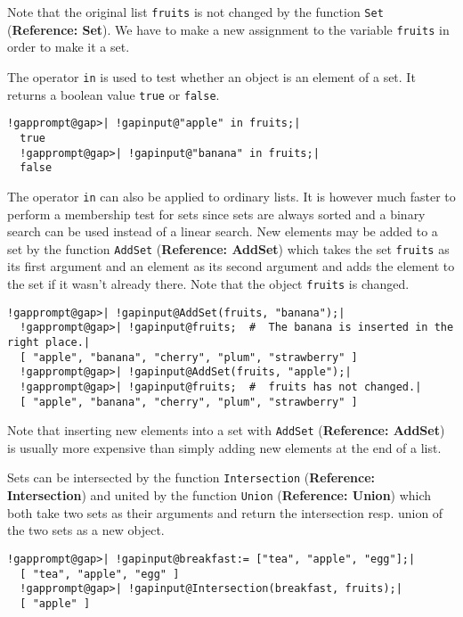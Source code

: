 \documentclass[a4paper,11pt]{report}
\begin{document}
{{ Note that the original list \texttt{fruits} is not changed by the function \texttt{Set} (\textbf{Reference: Set}). We have to make a new assignment to the variable \texttt{fruits} in order to make it a set. 

 The operator \texttt{in} is used to test whether an object is an element of a set. It returns a boolean
value \texttt{true} or \texttt{false}. 

 
\begin{Verbatim}[commandchars=!@|,fontsize=\small,frame=single,label=Example]
  !gapprompt@gap>| !gapinput@"apple" in fruits;|
  true
  !gapprompt@gap>| !gapinput@"banana" in fruits;|
  false
\end{Verbatim}
 

 The operator \texttt{in} can also be applied to ordinary lists. It is however much faster to perform a
membership test for sets since sets are always sorted and a binary search can
be used instead of a linear search. New elements may be added to a set by the
function \texttt{AddSet} (\textbf{Reference: AddSet}) which takes the set \texttt{fruits} as its first argument and an element as its second argument and adds the
element to the set if it wasn't already there. Note that the object \texttt{fruits} is changed. 

 
\begin{Verbatim}[commandchars=!@|,fontsize=\small,frame=single,label=Example]
  !gapprompt@gap>| !gapinput@AddSet(fruits, "banana");|
  !gapprompt@gap>| !gapinput@fruits;  #  The banana is inserted in the right place.|
  [ "apple", "banana", "cherry", "plum", "strawberry" ]
  !gapprompt@gap>| !gapinput@AddSet(fruits, "apple");|
  !gapprompt@gap>| !gapinput@fruits;  #  fruits has not changed.|
  [ "apple", "banana", "cherry", "plum", "strawberry" ]
\end{Verbatim}
 

 Note that inserting new elements into a set with \texttt{AddSet} (\textbf{Reference: AddSet}) is usually more expensive than simply adding new elements at the end of a
list. 

 Sets can be intersected by the function \texttt{Intersection} (\textbf{Reference: Intersection}) and united by the function \texttt{Union} (\textbf{Reference: Union}) which both take two sets as their arguments and return the intersection resp.
union of the two sets as a new object. 

 
\begin{Verbatim}[commandchars=!@|,fontsize=\small,frame=single,label=Example]
  !gapprompt@gap>| !gapinput@breakfast:= ["tea", "apple", "egg"];|
  [ "tea", "apple", "egg" ]
  !gapprompt@gap>| !gapinput@Intersection(breakfast, fruits);|
  [ "apple" ]
\end{Verbatim}
 

}}
\end{document}
